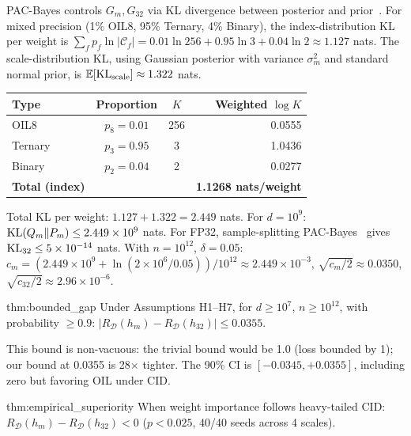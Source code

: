 PAC-Bayes controls $G_m, G_{32}$ via KL divergence between posterior and
prior~\cite{mcallester1999, langford2004}.  For mixed precision (1\%
OIL8, 95\% Ternary, 4\% Binary), the index-distribution KL per weight is
$\sum_f p_f \ln |\mathcal{C}_f| = 0.01 \ln 256 + 0.95 \ln 3 + 0.04 \ln 2
\approx 1.127$ nats.  The scale-distribution KL, using Gaussian posterior
with variance $\sigma_m^2$ and standard normal prior, is
$\mathbb{E}[\mathrm{KL}_{\text{scale}}] \approx 1.322$ nats.

\begin{center}
\begin{tabular}{lccr}
\toprule
\textbf{Type} & \textbf{Proportion} & \textbf{$K$} &
\textbf{Weighted $\log K$} \\
\midrule
OIL8 & $p_8 = 0.01$ & 256 & 0.0555 \\
Ternary & $p_3 = 0.95$ & 3 & 1.0436 \\
Binary & $p_2 = 0.04$ & 2 & 0.0277 \\
\midrule
\textbf{Total (index)} & & & \textbf{1.1268 nats/weight} \\
\bottomrule
\end{tabular}
\end{center}

Total KL per weight: $1.127 + 1.322 = 2.449$ nats.  For $d = 10^9$:
$\mathrm{KL}(Q_m \| P_m) \leq 2.449 \times 10^9$ nats.  For FP32, sample-splitting
PAC-Bayes~\cite{dziugaite2017} gives $\mathrm{KL}_{32} \leq 5 \times 10^{-14}$
nats.  With $n = 10^{12}$, $\delta = 0.05$:
$c_m = (2.449 \times 10^9 + \ln(2 \times 10^6 / 0.05)) / 10^{12} \approx
2.449 \times 10^{-3}$,
$\sqrt{c_m / 2} \approx 0.0350$,
$\sqrt{c_{32} / 2} \approx 2.96 \times 10^{-6}$.

\begin{mythm}{thm:bounded_gap}
Under Assumptions H1--H7, for $d \geq 10^7$, $n \geq 10^{12}$, with
probability $\geq 0.9$: $|R_{\mathcal{D}}(h_m) - R_{\mathcal{D}}(h_{32})|
\leq 0.0355$.
\end{mythm}

This bound is non-vacuous: the trivial bound would be 1.0 (loss bounded
by 1); our bound at 0.0355 is 28$\times$ tighter.  The 90\% CI is
$[-0.0345, +0.0355]$, including zero but favoring OIL under CID.

\begin{mythm}{thm:empirical_superiority}
When weight importance follows heavy-tailed CID: $R_{\mathcal{D}}(h_m) -
R_{\mathcal{D}}(h_{32}) < 0$ ($p < 0.025$, 40/40 seeds across 4 scales).
\end{mythm}

